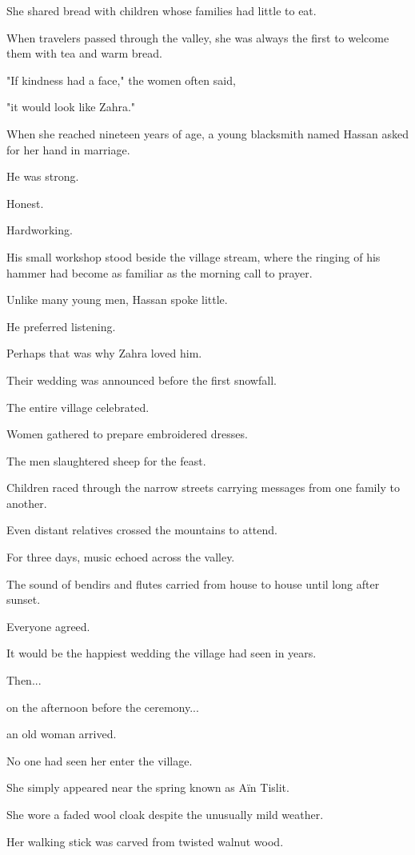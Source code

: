 \documentclass[12pt,openany]{book}
\begin{document}
She shared bread with children whose families had little to eat.

When travelers passed through the valley, she was always the first to welcome them with tea and warm bread.

"If kindness had a face," the women often said,

"it would look like Zahra."

When she reached nineteen years of age, a young blacksmith named Hassan asked for her hand in marriage.

He was strong.

Honest.

Hardworking.

His small workshop stood beside the village stream, where the ringing of his hammer had become as familiar as the morning call to prayer.

Unlike many young men, Hassan spoke little.

He preferred listening.

Perhaps that was why Zahra loved him.

Their wedding was announced before the first snowfall.

The entire village celebrated.

Women gathered to prepare embroidered dresses.

The men slaughtered sheep for the feast.

Children raced through the narrow streets carrying messages from one family to another.

Even distant relatives crossed the mountains to attend.

For three days, music echoed across the valley.

The sound of bendirs and flutes carried from house to house until long after sunset.

Everyone agreed.

It would be the happiest wedding the village had seen in years.

Then...

on the afternoon before the ceremony...

an old woman arrived.

No one had seen her enter the village.

She simply appeared near the spring known as Aïn Tislit.

She wore a faded wool cloak despite the unusually mild weather.

Her walking stick was carved from twisted walnut wood.
\end{document}
